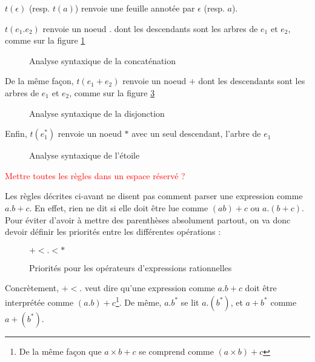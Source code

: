 $t(\epsilon)$ (resp. $t(a)$) renvoie une feuille annotée par $\epsilon$ (resp. $a$).

$t(e_1.e_2)$ renvoie un noeud $.$ dont les descendants sont les arbres de $e_1$ et $e_2$, comme sur la figure \ref{parseconcat}

\begin{figure}[h]
    \centering
 \raisebox{-2.2\height}{$t(e_1.e_2) =$} \raisebox{-0.5\height}{\Tree[.{.} $t(e_1)$ $t(e_2)$ ]}
    \caption{Analyse syntaxique de la concaténation}
    \label{parseconcat}
\end{figure}

De la même façon, $t(e_1+e_2)$ renvoie un noeud $+$ dont les descendants sont les arbres de $e_1$ et $e_2$, comme sur la figure \ref{parsedisj}

\begin{figure}[h]
    \centering
 \raisebox{-2.2\height}{$t(e_1+e_2) =$} \raisebox{-0.5\height}{\Tree[.{+} $t(e_1)$ $t(e_2)$ ]}
    \caption{Analyse syntaxique de la disjonction}
    \label{parsedisj}
\end{figure}

Enfin, $t(e_1^*)$ renvoie un noeud $*$ avec un seul descendant, l'arbre de $e_1$


\begin{figure}[h]
    \centering
 \raisebox{-2.2\height}{$t(e_1^*) =$} \raisebox{-0.5\height}{\Tree[.{*} $t(e_1)$ ]}
    \caption{Analyse syntaxique de l'étoile}
    \label{parsedisj}
\end{figure}

\textcolor{red}{Mettre toutes les règles dans un espace réservé ?}

Les règles décrites ci-avant ne disent pas comment parser une expression comme $a.b+c$. En effet, rien ne dit si elle doit être lue comme $(ab)+c$ ou $a.(b+c)$. Pour éviter d'avoir à mettre des parenthèses absolument partout, on va donc devoir définir les priorités entre les différentes opérations :

\begin{figure}[h]
    \centering
    $+ < . < *$
    \caption{Priorités pour les opérateurs d'expressions rationnelles}
    \label{prio}
\end{figure}

Concrètement, $+ < .$ veut dire qu'une expression comme $a.b+c$ doit être interprétée comme $(a.b)+c$\footnote{De la même façon que $a \times b + c$ se comprend comme $(a \times b) + c$}. De même, $a.b^*$ se lit $a.(b^*)$, et $a+b^*$ comme $a+(b^*)$.


